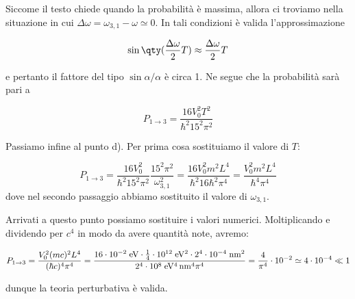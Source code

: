 \begin{soluzione}
   Siccome il testo chiede quando la probabilità è massima, allora ci troviamo nella situazione in cui $\Delta\omega=\omega_{3,1} - \omega \simeq 0$. In tali condizioni è valida l'approssimazione

   \begin{equation*}
      \sin{ \qty( \frac{\Delta \omega}{2} T ) }
      \approx \frac{\Delta \omega}{2} T
   \end{equation*}

   e pertanto il fattore del tipo $\sin{\alpha}/\alpha$ è circa 1. Ne segue che la probabilità sarà pari a

   \begin{equation*}
      P_{1 \to 3}
      =\frac{16 V_0^2 T^2}{\hbar^2 15^2 \pi^2}
   \end{equation*}
   
   Passiamo infine al punto d). Per prima cosa sostituiamo il valore di $T$:
   
   \begin{equation*}
      P_{1 \to 3}
      =\frac{16 V_0^2}{\hbar^2 15^2 \pi^2} \frac{15^2 \pi^2}{\omega_{3,1}^2}
      =\frac{16 V_0^2 m^2 L^4}{\hbar^2 16 \hbar^2 \pi^4}
      =\frac{V_0^2 m^2 L^4}{\hbar^4 \pi^4}
   \end{equation*}
   dove nel secondo passaggio abbiamo sostituito il valore di $\omega_{3,1}$.
   
   Arrivati a questo punto possiamo sostituire i valori numerici. Moltiplicando e dividendo per $c^4$ in modo da avere quantità note, avremo:

   \begin{equation*}
      P_{1 \to 3}
      =\frac{V_0^2 (mc)^2 L^4}{(\hbar c)^4 \pi^4}
      =\rm \frac{16 \cdot 10^{-2} \; eV \cdot \frac{1}{4} \cdot 10^{12} \; eV^2 \cdot 2^4 \cdot 10^{-4} \; nm^2}{2^4 \cdot 10^{8} \; eV^4 \, nm^4 \pi^4}
      =\frac{4}{\pi^4} \cdot 10^{-2}
      \simeq 4 \cdot 10^{-4}
      \ll 1
   \end{equation*}

   dunque la teoria perturbativa è valida.
\end{soluzione}